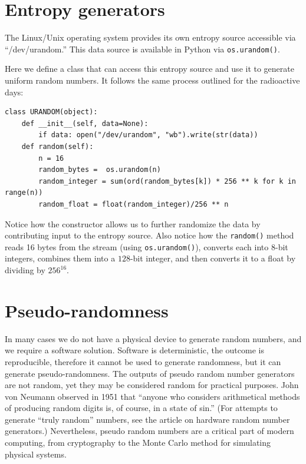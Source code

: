 \documentclass[justified, sixbynine]{tufte-book}
\def\ft{\small\tt}
\theoremstyle{plain}%
\newtheorem * {corollary}{Corollary}
\theoremstyle{definition}
\theoremstyle{remark}
\newtheorem * {remark}{Remark}
\newtheorem * {note}{Note}
\begin{document}
\begin{fullwidth}
\goodbreak\section{Entropy generators}

The Linux/Unix operating system provides its own entropy source accessible via ``/dev/urandom.'' This data source is available in Python via {\ft os.urandom()}.

Here we define a class that can access this entropy source and use it to generate uniform random numbers. It follows the same process outlined for the radioactive days:


\begin{lstlisting}
class URANDOM(object):
    def __init__(self, data=None):
        if data: open("/dev/urandom", "wb").write(str(data))
    def random(self):
        n = 16
        random_bytes =  os.urandom(n)
        random_integer = sum(ord(random_bytes[k]) * 256 ** k for k in range(n))
        random_float = float(random_integer)/256 ** n
\end{lstlisting}

Notice how the constructor allows us to further randomize the data by contributing input to the entropy source. Also notice how the {\ft random()} method reads 16 bytes from the stream (using {\ft os.urandom()}), converts each into $8$-bit integers, combines them into a $128$-bit integer, and then converts it to a float by dividing by $256^{16}$.

\goodbreak\section{Pseudo-randomness}

In many cases we do not have a physical device to generate random numbers, 
and we require a software solution. Software is deterministic, the outcome
is reproducible, therefore it cannot be used to generate randomness, but it
can generate pseudo-randomness. The outputs of pseudo random number
generators are not random, yet they may be considered random for practical purposes.
John von Neumann observed in 1951 that ``anyone who
considers arithmetical methods of producing random digits is, of course, in
a state of sin.'' (For attempts to generate ``truly random'' numbers, see
the article on hardware random number generators.) Nevertheless, 
pseudo random numbers are a critical part of modern computing, from
cryptography to the Monte Carlo method for simulating physical systems.


\end{fullwidth}
\end{document}
